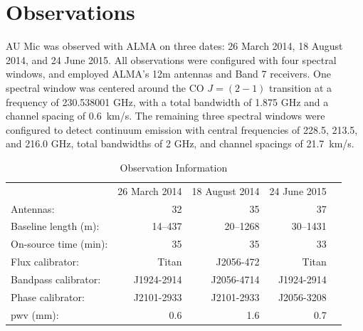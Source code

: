 \documentclass[12pt,oneside]{book}
\begin{document}
% 
% 
% 
\mainmatter 
% 

\chapter{Observations}
\label{chap: observations}
AU Mic was observed  with ALMA on three dates: 26 March 2014, 18 August 2014, and 24 June 2015. 
All observations were configured with four spectral windows, and employed ALMA's 12m antennas and Band 7 receivers. 
One spectral window was centered around the CO $J = (2-1)$ transition at a frequency of 230.538001 GHz, with a total bandwidth of 1.875 GHz and a channel spacing of \SI{0.6}{km/s}.
The remaining three spectral windows were configured to detect continuum emission with central frequencies of 228.5, 213.5, and 216.0 GHz, total bandwidths of 2 GHz, and channel spacings of \SI{21.7}{km/s}.

\begin{table}	
  \centering
	\caption{Observation Information}
  \label{tab:observations}
  \begin{tabular}{lrrrr}
    \toprule
    & 26 March 2014 & 18 August 2014 & 24 June 2015 \\
    \cmidrule(lr){2-4}
    Antennas: & 32 & 35 & 37 \\
    Baseline length (m): & 14--437 & 20--1268 & 30--1431 \\
    On-source time (min): & 35 & 35 & 33 \\
    Flux calibrator: & Titan & J2056-472 & Titan \\
    Bandpass calibrator: & J1924-2914 & J2056-4714 & J1924-2914 \\
    Phase calibrator: & J2101-2933 & J2101-2933 & J2056-3208  \\
    pwv (mm): & 0.6 & 1.6 & 0.7 \\
    \bottomrule
  \end{tabular}
\end{table}
\end{document}
